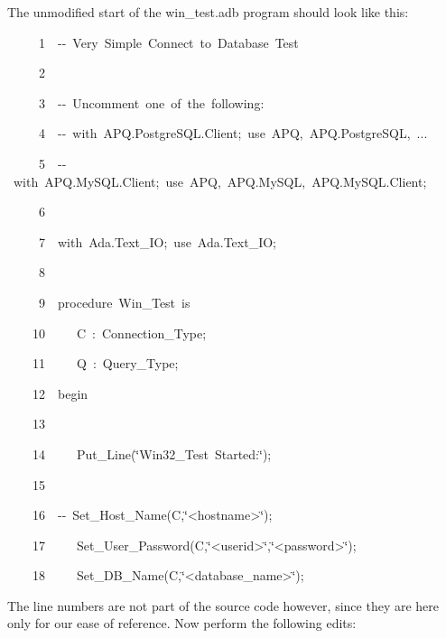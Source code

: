 \documentclass[english]{report}
\newenvironment{lyxcode}
   {\begin{list}{}{
     \setlength{\rightmargin}{\leftmargin}
     \setlength{\listparindent}{0pt}%
     \raggedright
     \setlength{\itemsep}{0pt}
     \setlength{\parsep}{0pt}
     \normalfont\ttfamily}%
    \item[]}
   {\end{list}}
\begin{document}
The unmodified start of the win\_test.adb program should look like
this:

\begin{lyxcode}
~{\footnotesize ~~~~1~~-{}-~Very~Simple~Connect~to~Database~Test}{\footnotesize \par}

~{\footnotesize ~~~~2}{\footnotesize \par}

~{\footnotesize ~~~~3~~-{}-~Uncomment~one~of~the~following:}{\footnotesize \par}

~{\footnotesize ~~~~4~~-{}-~with~APQ.PostgreSQL.Client;~use~APQ,~APQ.PostgreSQL,~...}{\footnotesize \par}

~{\footnotesize ~~~~5~~-{}-~with~APQ.MySQL.Client;~use~APQ,~APQ.MySQL,~APQ.MySQL.Client;}{\footnotesize \par}

~{\footnotesize ~~~~6}{\footnotesize \par}

~{\footnotesize ~~~~7~~with~Ada.Text\_IO;~use~Ada.Text\_IO;}{\footnotesize \par}

~{\footnotesize ~~~~8}{\footnotesize \par}

~{\footnotesize ~~~~9~~procedure~Win\_Test~is}{\footnotesize \par}

~{\footnotesize ~~~10~~~~~C~:~Connection\_Type;}{\footnotesize \par}

~{\footnotesize ~~~11~~~~~Q~:~Query\_Type;}{\footnotesize \par}

~{\footnotesize ~~~12~~begin}{\footnotesize \par}

~{\footnotesize ~~~13}{\footnotesize \par}

~{\footnotesize ~~~14~~~~~Put\_Line(\char`\"{}Win32\_Test~Started:\char`\"{});}{\footnotesize \par}

~{\footnotesize ~~~15}{\footnotesize \par}

~{\footnotesize ~~~16~~-{}-~Set\_Host\_Name(C,\char`\"{}<hostname>\char`\"{});}{\footnotesize \par}

~{\footnotesize ~~~17~~~~~Set\_User\_Password(C,\char`\"{}<userid>\char`\"{},\char`\"{}<password>\char`\"{});}{\footnotesize \par}

~{\footnotesize ~~~18~~~~~Set\_DB\_Name(C,\char`\"{}<database\_name>\char`\"{});}{\footnotesize \par}
\end{lyxcode}
The line numbers are not part of the source code however, since they
are here only for our ease of reference. Now perform the following
edits:
\end{document}

